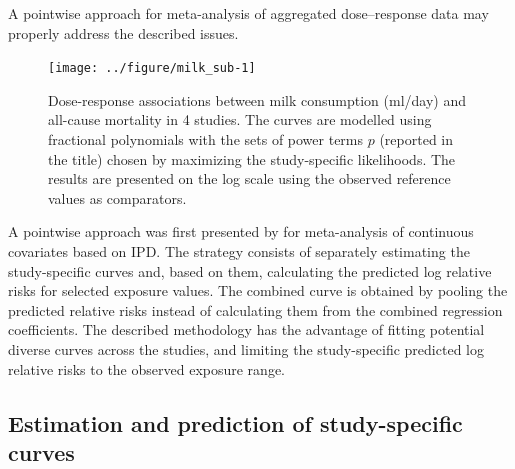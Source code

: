 \documentclass[11pt,a4paper,twoside,openany]{book}\usepackage{knitr}
\begin{document}
{A pointwise approach for meta-analysis of aggregated dose--response data may properly address the described issues.

\begin{knitrout}\footnotesize
{}\color{fgcolor}\begin{figure}[ht!]

{\centering \texttt{[image: ../figure/milk\_sub-1]} 

}

\caption[Dose-response associations between milk consumption (ml/day) and all-cause mortality in 4 studies]{Dose-response associations between milk consumption (ml/day) and all-cause mortality in 4 studies. The curves are modelled using fractional polynomials with the sets of power terms $p$ (reported in the title) chosen by maximizing the study-specific likelihoods. The results are presented on the log scale using the observed reference values as comparators.}\label{fig:milk_sub}
\end{figure}


\end{knitrout}

A pointwise approach was first presented by \cite{sauerbrei2011new} for meta-analysis of continuous covariates based on IPD. The strategy consists of separately estimating the study-specific curves and, based on them, calculating the predicted log relative risks for selected exposure values. The combined curve is obtained by pooling the predicted relative risks instead of calculating them from the combined regression coefficients. The described methodology has the advantage of fitting potential diverse curves across the studies, and limiting the study-specific predicted log relative risks to the observed exposure range.   

\subsection{Estimation and prediction of study-specific curves}

}
\end{document}
